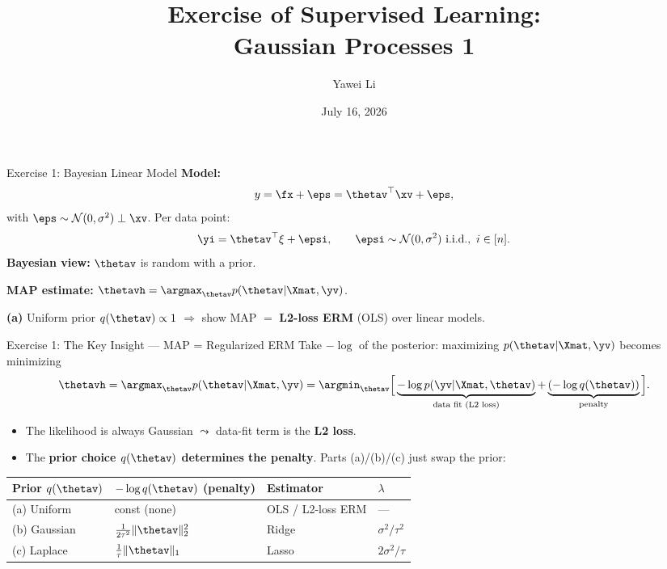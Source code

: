 \documentclass[aspectratio=169]{beamer}
\title[]{\textbf{Exercise of Supervised Learning:\\Gaussian Processes 1}}
\author{Yawei Li}
\institute[LMU]
{
\\
  \texttt{yawei.li@stat.uni-muenchen.de}
}
\date{July 16, 2026}
\newcommand{\Norm}{\mathcal{N}}
\begin{document}
\begin{frame}
\titlepage

\end{frame}

\begin{frame}{Exercise 1: Bayesian Linear Model}
\small
\textbf{Model:}
\begin{equation*}
	y = \fx + \eps = \thetav^\top \xv + \eps,
\end{equation*}
with $\eps \sim \Norm(0, \sigma^2) \perp \xv$. Per data point:
\begin{equation*}
	\yi = \thetav^\top \xi + \epsi, \qquad \epsi \sim \Norm(0, \sigma^2) \text{ i.i.d.}, \ i \in [n].
\end{equation*}
\textbf{Bayesian view:} $\thetav$ is random with a prior.

\smallskip
\textbf{MAP estimate:} $\thetavh = \argmax_{\thetav} p(\thetav | \Xmat, \yv)$.

\smallskip
\textbf{(a)} Uniform prior $q(\thetav) \propto 1$ $\Rightarrow$ show MAP $=$ \textbf{L2-loss ERM} (OLS) over linear models.
\end{frame}

\begin{frame}{Exercise 1: The Key Insight --- MAP = Regularized ERM}
	\small
	Take $-\log$ of the posterior: maximizing $p(\thetav|\Xmat,\yv)$ becomes minimizing
	\begin{equation*}
		\thetavh = \argmax_{\thetav} p(\thetav | \Xmat, \yv)
		= \argmin_{\thetav} \Big[ \underbrace{-\log p(\yv | \Xmat, \thetav)}_{\text{data fit (L2 loss)}} + \underbrace{(-\log q(\thetav))}_{\text{penalty}} \Big].
	\end{equation*}
	\begin{itemize}
		\item The likelihood is always Gaussian $\leadsto$ data-fit term is the \textbf{L2 loss}.
		\item The \textbf{prior choice $q(\thetav)$ determines the penalty}. Parts (a)/(b)/(c) just swap the prior:
	\end{itemize}
	\medskip
	\begin{center}
	\renewcommand{\arraystretch}{1.3}
	\begin{tabular}{@{}llll@{}}
		\toprule
		\textbf{Prior $q(\thetav)$} & \textbf{$-\log q(\thetav)$ (penalty)} & \textbf{Estimator} & \textbf{$\lambda$} \\
		\midrule
		(a) Uniform & const (none) & OLS / L2-loss ERM & --- \\
		(b) Gaussian & $\tfrac{1}{2\tau^2}\|\thetav\|_2^2$ & Ridge & $\sigma^2/\tau^2$ \\
		(c) Laplace & $\tfrac{1}{\tau}\|\thetav\|_1$ & Lasso & $2\sigma^2/\tau$ \\
		\bottomrule
	\end{tabular}
	\end{center}
\end{frame}
\end{document}
